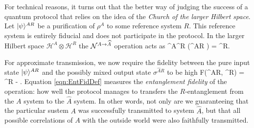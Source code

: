 \documentclass[aps,11pt,twoside,letterpaper]{article}
\def\cH{\mathcal{H}}
\begin{document}
            For technical reasons, it turns out that the better way of  
            judging the success of a quantum protocol 
			that relies on the idea of the \emph{Church of the larger Hilbert space}.
			Let $| \psi \rangle^{AR}$ be a purification of $\rho^A$ to some reference system $R$. 
			This reference system is entirely fiducial and does not participate in the protocol.
			In the larger Hilbert space $\cH^A\otimes\cH^R$ the ${\cal N}^{A \to \widehat{A}}$ operation acts as
			\be
				\cN^{A\to {}}\!\!\otimes\!\id^R \!\left(\proj{\psi}^{AR} \right) = \sigma^{R}.
			\ee
			
			
			For approximate transmission, we now require the fidelity between the pure input state $| \psi \rangle^{AR}$ 
			and the possibly mixed output state $\sigma^{\widehat{A}R}$ to be high
			\be	\label{eqn:EntFidDef}
				F(\ket{\psi}^{AR}, \sigma^{R}) 
					= 		 \sigma^{R} 
					 - \epsilon.
			\ee
			Equation \eqref{eqn:EntFidDef} measures the \emph{entanglement fidelity} of the operation: 
			how well the protocol manages to transfers the $R$-entanglement from the $A$ system to the $\widehat{A}$
			system. 
            In other words, not only are we guaranteeing that the particular sustem $A$ was successfully 
            transmitted to system $\widehat{A}$, but that all possible correlations of $A$ with the outside
            world were also faithfully transmitted.
\end{document}
